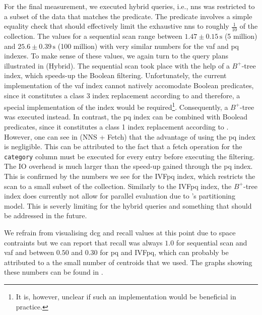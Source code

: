 For the final measurement, we executed hybrid queries, i.e., \acrshort{nns} was restricted to a subset of the data that matches the predicate. The predicate involves a simple equality check that should effectively limit the exhaustive \acrshort{nns} to roughly $\frac{1}{10}$ of the collection. The values for a sequential scan range between $1.47 \pm 0.15 \, \si{\second}$ (5 million) and $25.6 \pm 0.39 \, \si{\second}$ (100 million) with very similar numbers for the \acrshort{vaf} and \acrshort{pq} indexes. To make sense of these values, we again turn to the query plans illustrated in  (Hybrid). The sequential scan took place with the help of a $B^{+}$-tree index, which speeds-up the Boolean filtering. Unfortunately, the current implementation of the \acrshort{vaf} index cannot natively accomodate Boolean predicates, since it constitutes a class 3 index replacement according to  and therefore, a special implementation of the index would be required\footnote{It is, however, unclear if such an implementation would be beneficial in practice.}. Consequently, a $B^{+}$-tree was executed instead. In contrast, the \acrshort{pq} index can be combined with Boolead predicates, since it constitutes a class 1 index replacement according to . However, one can see in  (NNS + Fetch) that the advantage of using the \acrshort{pq} index is negligible.
This can be attributed to the fact that a fetch operation for the \texttt{category} column must be executed for every entry before executing the filtering. The IO overhead is much larger than the speed-up gained through the \acrshort{pq} index. This is confirmed by the numbers we see for the IVF\acrshort{pq} index, which restricts the scan to a small subset of the collection. Similarly to the IVF\acrshort{pq} index, the $B^{+}$-tree index does currently not allow for parallel evaluation due to \cottontail{}'s partitioning model. This is severly limiting for the hybrid queries and something that should be addressed in the future.

We refrain from visualising \acrshort{dcg} and recall values at this point due to space contraints but we can report that recall was always $1.0$ for sequential scan and \acrshort{vaf} and between $0.50$ and $0.30$ for \acrshort{pq} and IVF\acrshort{pq}, which can probably be attributed to a the small number of centroids that we used. The graphs showing these numbers can be found in .

